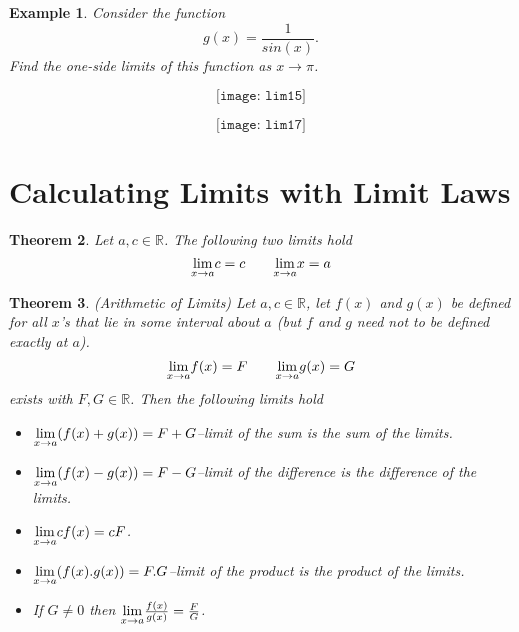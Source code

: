 \documentclass[12pt,a4paper]{book}
\newtheorem{theorem}{Theorem}[section]
\newtheorem{Example}[theorem]{Example}
\numberwithin{equation}{section}
\begin{document}
\begin{Example}
	Consider the function $$g(x)=\frac{1}{sin(x)}.$$ Find the one-side limits of this function as $x\rightarrow \pi$.
\end{Example}
	$$
\texttt{[image: lim15]}
$$

	$$
\texttt{[image: lim17]}
$$



\newpage
\section{Calculating Limits with Limit Laws} 

\begin{mdframed}
	\begin{theorem}
	Let $a,c\in \mathbb{R}$. The following two limits hold 
	$$  	\underset{x\rightarrow a}{\rm lim}c=c \quad \quad 	\underset{x\rightarrow a}{\rm lim}x=a $$
	\end{theorem}
	
\end{mdframed}




\begin{tcolorbox}[width=\textwidth,colback={blue!10},title={},colbacktitle=yellow,coltitle=blue]    
\begin{theorem}(Arithmetic of Limits)
	Let $a,c\in \mathbb{R}$, let $f(x)$ and $g(x)$ be defined for all $x$'s that lie in some interval about $a$ (but $f$ and $g$ need not to be defined exactly at $a$).
	$$\underset{x\rightarrow a}{\rm lim}f(x)=F \quad \quad \underset{x\rightarrow a}{\rm lim}g(x)=G$$ 
	exists with $F,G\in \mathbb{R}$. Then the following limits hold
	\begin{itemize}
		\item 	$ \underset{x\rightarrow a}{\rm lim}(f(x)+g(x))=F+G$--limit of the sum is the sum of the limits.
		\item $ \underset{x\rightarrow a}{\rm lim}(f(x)-g(x))=F-G$--limit of the difference is the difference of the limits.
		\item $\underset{x\rightarrow a}{\rm lim}cf(x)=cF$.
		\item $ \underset{x\rightarrow a}{\rm lim}(f(x).g(x))=F.G$--limit of the product is the product of the limits.
		\item If $G\neq 0$ then $\underset{x\rightarrow a}{\rm lim}\frac{f(x)}{g(x)}=\frac{F}{G}$.
	\end{itemize}
\end{theorem}
\end{tcolorbox} 
\end{document}
